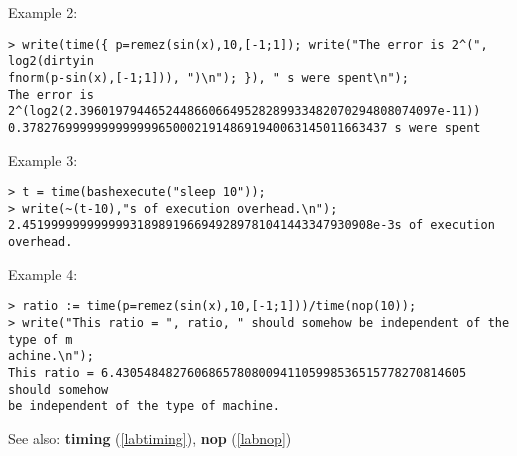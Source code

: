 \noindent Example 2: 
\begin{center}\begin{minipage}{15cm}\begin{Verbatim}[frame=single]
> write(time({ p=remez(sin(x),10,[-1;1]); write("The error is 2^(", log2(dirtyin
fnorm(p-sin(x),[-1;1])), ")\n"); }), " s were spent\n");
The error is 2^(log2(2.39601979446524486606649528289933482070294808074097e-11))
0.378276999999999999965000219148691940063145011663437 s were spent
\end{Verbatim}
\end{minipage}\end{center}
\noindent Example 3: 
\begin{center}\begin{minipage}{15cm}\begin{Verbatim}[frame=single]
> t = time(bashexecute("sleep 10"));
> write(~(t-10),"s of execution overhead.\n");
2.4519999999999993189891966949289781041443347930908e-3s of execution overhead.
\end{Verbatim}
\end{minipage}\end{center}
\noindent Example 4: 
\begin{center}\begin{minipage}{15cm}\begin{Verbatim}[frame=single]
> ratio := time(p=remez(sin(x),10,[-1;1]))/time(nop(10));
> write("This ratio = ", ratio, " should somehow be independent of the type of m
achine.\n");
This ratio = 6.4305484827606865780800941105998536515778270814605 should somehow 
be independent of the type of machine.
\end{Verbatim}
\end{minipage}\end{center}
See also: \textbf{timing} (\ref{labtiming}), \textbf{nop} (\ref{labnop})
